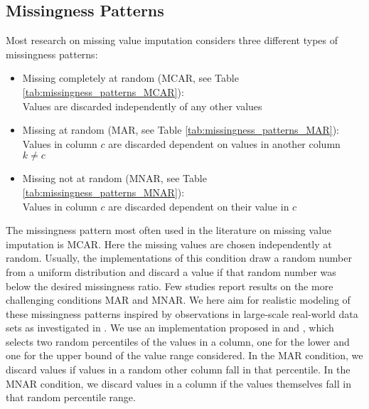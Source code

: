 \subsection{Missingness Patterns}
\label{sec:missingess_pattern}
Most research on missing value imputation considers three different types of missingness patterns:
%
\begin{itemize}
\item Missing completely at random (MCAR, see Table \ref{tab:missingness_patterns_MCAR}): \\
Values are discarded independently of any other values
\item Missing at random (MAR, see Table \ref{tab:missingness_patterns_MAR}): \\
Values in column $c$ are discarded dependent on values in another column $k\neq c$
\item Missing not at random (MNAR, see Table \ref{tab:missingness_patterns_MNAR}): \\
Values in column $c$ are discarded dependent on their value in $c$
\end{itemize}
%
The missingness pattern most often used in the literature on missing value imputation is MCAR. Here the missing values are chosen independently at random. Usually, the implementations of this condition draw a random number from a uniform distribution and discard a value if that random number was below the desired missingness ratio. Few studies report results on the more challenging conditions MAR and MNAR. We here aim for realistic modeling of these missingness patterns inspired by observations in large-scale real-world data sets as investigated in \cite{Biessmann2018a}. We use an implementation proposed in \cite{Schelter2020a} and \cite{Jenga}, which selects two random percentiles of the values in a column, one for the lower and one for the upper bound of the value range considered. In the MAR condition, we discard values if values in a random other column fall in that percentile. In the MNAR condition, we discard values in a column if the values themselves fall in that random percentile range.
%
